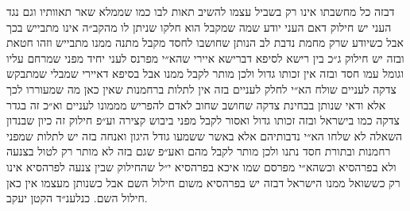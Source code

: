 \documentclass[12pt, openany]{book}
\begin{document}
\begin{multicols}{2}
דבזה כל מחשבתו אינו רק בשביל עצמו להשיב תאות לבו כמו שממלא שאר תאוותיו וגם נגד העני יש חילוק דאם העני יודע שמה שמקבל הוא חלקו שניתן לו מהקב״ה אינו מתבייש בכך אבל כשיודע שרק מחמת נדבת לב הנותן שחושבו לחסד מקבל מתנה ממנו מתבייש וזהו חטאת ובזה יש חילוק ג״כ בין רישא לסיפא דברישא איירי שהא״י מפרנס לעני יחיד מפני שמרחם עליו וגומל עמו חסד ובזה אין זכותו גדול ולכן מותר לקבל ממנו אבל בסיפא דאיירי שמבלי שמתבקש צדקה לעניים שולח הא״י לחלק לעניים בזה אין לתלות ברחמנות שאין כאן מה שמעוררו לכך אלא ודאי שנותן בבחינת צדקה שחושב שחוב לאדם להפריש מממונו לעניים וא״כ זה בגדר צדקה כמו בישראל ובזה זכותו גדול ואסור לקבל מפני ביבוש קצירה וע״פ חילוק זה כיון שבנדון השאלה לא שלחו הא״י נדבותיהם אלא באשר ששמעו גודל היגון ואנחה בזה יש לתלות שמפני רחמנות ובתורת חסד נתנו ולכן מותר לקבל מהם ואע״פ שגם בזה לא מותר רק לטול בצנעה ולא בפרהסיא וכשהא״י מפרסם שמו איכא בפרהסיא י״ל שהחילוק שבין צנעה לפרהסיא אינו רק כששואל ממנו הישראל דבזה יש בפרהסיא משום חילול השם אבל כשנותן מעצמו אין כאן חילול השם. כנלענ״ד הקטן יעקב.\\\vspace{0pt}

\end{multicols}\newpage
\end{document}
